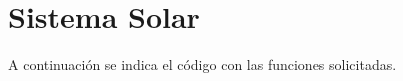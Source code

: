 \section{Sistema Solar}

  A continuación se indica el código con las funciones
  solicitadas.
  
    